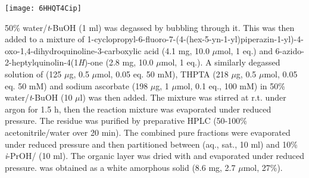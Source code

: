 	\begin{scheme}[H]
		\begin{center}
			\texttt{[image: 6HHQT4Cip]}
		\end{center}
	\end{scheme}
	

50\% water/\textit{t}-BuOH (1 ml) was degassed by bubbling  through it. This was then added to a mixture of 1-cyclopropyl-6-fluoro-7-(4-(hex-5-yn-1-yl)piperazin-1-yl)-4-oxo-1,4\hyp{}dihydro\-quinoline-3-carboxylic acid  (4.1 mg, 10.0 $\mu$mol, 1 eq.) and 6-azido-2-heptylquinolin-4(1\textit{H})-one  (2.8 mg, 10.0 $\mu$mol, 1 eq.).
A similarly degassed solution of  (125 $\mu$g, 0.5 $\mu$mol, 0.05 eq. 50 mM), THPTA (218 $\mu$g, 0.5 $\mu$mol, 0.05 eq. 50 mM) and sodium ascorbate (198 $\mu$g, 1 $\mu$mol, 0.1 eq., 100 mM) in 50\% water/\textit{t}-BuOH (10 $\mu$l) was then added. 
The mixture was stirred at r.t. under argon for 1.5 h, then the reaction mixture was evaporated under reduced pressure. The residue was purified by preparative HPLC (50-100\% acetonitrile/water over 20 min).
The combined pure fractions were evaporated under reduced pressure and then partitioned between  (aq., sat., 10 ml) and 10\% \textit{i}-PrOH/ (10 ml). The organic layer was dried with  and evaporated under reduced pressure.
 was obtained as a white amorphous solid (8.6 mg, 2.7 $\mu$mol, 27\%). %
\\[1\baselineskip]
\\[1\baselineskip]
